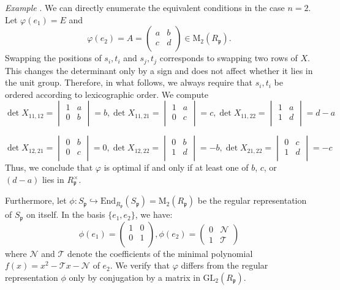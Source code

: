 \documentclass[12pt]{article}
\theoremstyle{plain}
\theoremstyle{definition}
\theoremstyle{remark}
\begin{document}
\emph{Example} \cite[Proposition 30.5.3(a)]{voight2021quaternion}. We can directly enumerate the equivalent conditions in the case $n=2$. Let $\varphi(e_1)=E$ and
$$\varphi(e_2)=A=\begin{pmatrix}
a & b \\
c & d \\
\end{pmatrix}\in \mathrm{M}_2(R_\mathfrak{p}).$$
Swapping the positions of $s_i,t_i$ and $s_j,t_j$ corresponds to swapping two rows of $X$. This changes the determinant only by a sign and does not affect whether it lies in the unit group. Therefore, in what follows, we always require that $s_i,t_i$ be ordered according to lexicographic order. We compute
$$\det X_{11,12}=\begin{vmatrix}
1 & a \\
0 & b \\
\end{vmatrix}=b,
\det X_{11,21}=\begin{vmatrix}
1 & a \\
0 & c \\
\end{vmatrix}=c,
\det X_{11,22}=\begin{vmatrix}
1 & a \\
1 & d \\
\end{vmatrix}=d-a$$

$$
\det X_{12,21}=\begin{vmatrix}
0 & b \\
0 & c \\
\end{vmatrix}=0,
\det X_{12,22}=\begin{vmatrix}
0 & b \\
1 & d \\
\end{vmatrix}=-b,
\det X_{21,22}=\begin{vmatrix}
0 & c \\
1 & d \\
\end{vmatrix}=-c
$$
Thus, we conclude that $\varphi$ is optimal if and only if at least one of $b$, $c$, or $(d-a)$ lies in $R_\mathfrak{p}^\times$.

Furthermore, let $\phi:S_\mathfrak{p}\hookrightarrow \mathrm{End}_{R_\mathfrak{p}}(S_\mathfrak{p})=\mathrm{M}_2(R_\mathfrak{p})$ be the regular representation of $S_\mathfrak{p}$ on itself. In the basis $\{e_1,e_2\}$, we have:
\[\phi(e_1)=
\begin{pmatrix}
1 & 0 \\
0 & 1 \\
\end{pmatrix}
, \phi(e_2)=
\begin{pmatrix}
0  & \mathcal{N} \\
1  & \mathcal{T} 
\end{pmatrix}
\]
where $\mathcal{N}$ and $\mathcal{T}$ denote the coefficients of the minimal polynomial $f(x)=x^2-\mathcal{T}x-\mathcal{N}$ of $e_2$. We verify that $\varphi$ differs from the regular representation $\phi$ only by conjugation by a matrix in $\mathrm{GL}_2(R_\mathfrak{p})$. 
\end{document}
